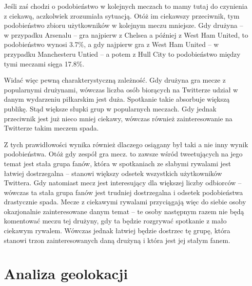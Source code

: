 Jeśli zaś chodzi o podobieństwo w kolejnych meczach to mamy tutaj do czynienia
z ciekawą, aczkolwiek zrozumiała sytuacją. Otóż im ciekawszy przeciwnik,
tym podobieństwo zbioru użytkowników w kolejnym meczu mniejsze.
Gdy drużyna -- w przypadku Arsenalu --  gra najpierw z Chelsea a później z 
West Ham United, to podobieństwo wynosi 3.7\%, a gdy najpierw gra z 
West Ham United -- w przypadku Manchesteru Untied -- a potem z Hull City
to podobieństwo między tymi meczami sięga 17.8\%.

Widać więc pewną charakterystyczną zależność. Gdy drużyna gra mecze z popularnymi
drużynami, wówczas liczba osób biorących na Twitterze udział w danym wydarzeniu
piłkarskim jest duża. Spotkanie takie absorbuje większą publikę. Stąd
większe słupki grup w popularnych meczach. Gdy jednak przeciwnik jest już nieco
mniej ciekawy, wówczas również zainteresowanie na Twitterze takim meczem spada.

Z tych prawidłowości wynika również dlaczego osiągany był taki a nie inny
wynik podobieństwa. Otóż gdy zespół gra mecz. to zawsze
wśród tweetujących na jego temat jest stała grupa fanów, która w spotkaniach
ze słabymi rywalami jest łatwiej dostrzegalna -- stanowi większy odsetek
wszystkich użytkowników Twittera. Gdy natomiast mecz jest interesujący
dla większej liczby odbiorców -- wówczas ta stała grupa fanów jest trudniej
dostrzegalna i odsetek podobieństwa drastycznie spada.
Mecze z ciekawymi rywalami przyciągają więc do siebie osoby okazjonalnie zainteresowane
danym temat -- te osoby następnym razem nie będą komentować meczu tej drużyny,
gdy ta będzie rozgrywać spotkanie z mało ciekawym rywalem. 
Wówczas jednak łatwiej będzie dostrzec tę grupę, która stanowi trzon zainteresowanych
daną drużyną i która jest jej stałym fanem.













\vfill
\section{Analiza geolokacji}
\label{section:analizageograficzna}

